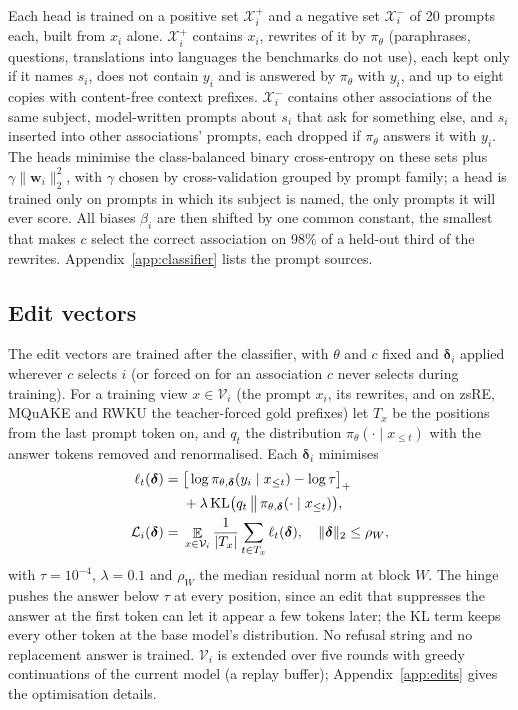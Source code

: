 \documentclass{article}
\theoremstyle{remark}
\theoremstyle{definition}
\begin{document}
Each head is trained on a positive set $\mathcal X_i^+$ and a negative set $\mathcal X_i^-$ of 20 prompts each, built from $x_i$ alone. $\mathcal X_i^+$ contains $x_i$, rewrites of it by $\pi_\theta$ (paraphrases, questions, translations into languages the benchmarks do not use), each kept only if it names $s_i$, does not contain $y_i$ and is answered by $\pi_\theta$ with $y_i$, and up to eight copies with content-free context prefixes. $\mathcal X_i^-$ contains other associations of the same subject, model-written prompts about $s_i$ that ask for something else, and $s_i$ inserted into other associations' prompts, each dropped if $\pi_\theta$ answers it with $y_i$. The heads minimise the class-balanced binary cross-entropy on these sets plus $\gamma\|\mathbf w_i\|_2^2$, with $\gamma$ chosen by cross-validation grouped by prompt family; a head is trained only on prompts in which its subject is named, the only prompts it will ever score. All biases $\beta_i$ are then shifted by one common constant, the smallest that makes $c$ select the correct association on 98\% of a held-out third of the rewrites. Appendix~\ref{app:classifier} lists the prompt sources.

\subsection{Edit vectors}
\label{sec:edits}
The edit vectors are trained after the classifier, with $\theta$ and $c$ fixed and $\boldsymbol\delta_i$ applied wherever $c$ selects $i$ (or forced on for an association $c$ never selects during training). For a training view $x\in\mathcal V_i$ (the prompt $x_i$, its rewrites, and on zsRE, MQuAKE and RWKU the teacher-forced gold prefixes) let $T_x$ be the positions from the last prompt token on, and $q_t$ the distribution $\pi_\theta(\cdot\mid x_{\le t})$ with the answer tokens removed and renormalised. Each $\boldsymbol\delta_i$ minimises
\begin{align}
 \ell_t(\boldsymbol\delta)={}&\big[\log\pi_{\theta,\boldsymbol\delta}(y_i\mid x_{\le t})-\log\tau\big]_+\notag\\
 &+\lambda\,\mathrm{KL}\big(q_t\,\big\|\,\pi_{\theta,\boldsymbol\delta}(\cdot\mid x_{\le t})\big),\notag\\
 \mathcal L_i(\boldsymbol\delta)={}&\mathop{\mathbb E}_{x\in\mathcal V_i}\frac{1}{|T_x|}\sum_{t\in T_x}\ell_t(\boldsymbol\delta),\quad\|\boldsymbol\delta\|_2\le\rho_W,
 \label{eq:loss}
\end{align}
with $\tau=10^{-4}$, $\lambda=0.1$ and $\rho_W$ the median residual norm at block $W$. The hinge pushes the answer below $\tau$ at every position, since an edit that suppresses the answer at the first token can let it appear a few tokens later; the KL term keeps every other token at the base model's distribution. No refusal string and no replacement answer is trained. $\mathcal V_i$ is extended over five rounds with greedy continuations of the current model (a replay buffer); Appendix~\ref{app:edits} gives the optimisation details.
\end{document}

